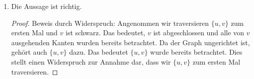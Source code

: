 \documentclass[11pt,a4paper]{article}
\begin{document}
\begin{loesung}
    \begin{enumerate}
        \item
        Die Aussage ist richtig.
        \begin{proof}
            Beweis durch Widerspruch:
            Angenommen wir traversieren $\{u, v\}$ zum ersten Mal und $v$ ist schwarz.
            Das bedeutet, $v$ ist abgeschlossen und alle von $v$ ausgehenden Kanten wurden bereits betrachtet.
            Da der Graph ungerichtet ist, gehört auch $\{u, v\}$ dazu.
            Das bedeutet $\{u, v\}$ wurde bereits betrachtet.
            Dies stellt einen Widerspruch zur Annahme dar, dass wir $\{u, v\}$ zum ersten Mal traversieren.
        \end{proof}

\end{enumerate}
\end{loesung}
\end{document}
